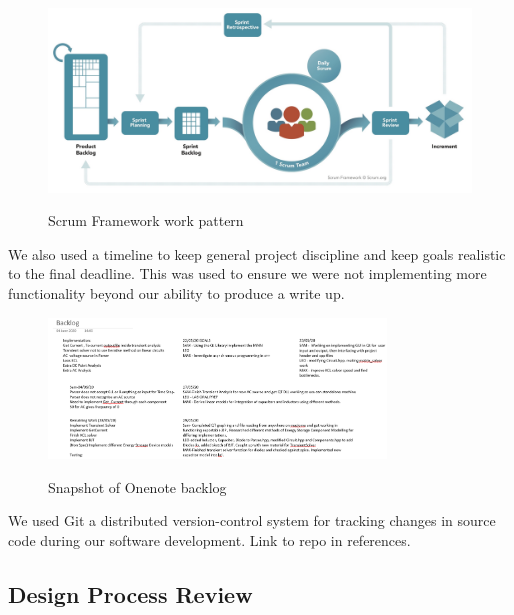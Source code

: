 \documentclass{article}
\begin{document}
\begin{figure}[h]
    \caption{Scrum Framework work pattern}
    \centering
    \includegraphics[width=\textwidth]{images/ScrumFramework.jpg}
    \label{fig:Scrum}
\end{figure}
We also used a timeline to keep general project discipline and keep goals realistic to the final deadline. This was used to ensure we were not implementing more functionality beyond our ability to produce a write up.
\begin{figure}[h]
    \caption{Snapshot of Onenote backlog}
    \centering
    \includegraphics[width=0.8\textwidth]{images/Backlog.PNG}
    \label{fig:BackLog}
\end{figure}
We used Git a distributed version-control system for tracking changes in source code during our software development. Link to repo in references. 

\newpage
\subsection{Design Process Review}
\end{document}
